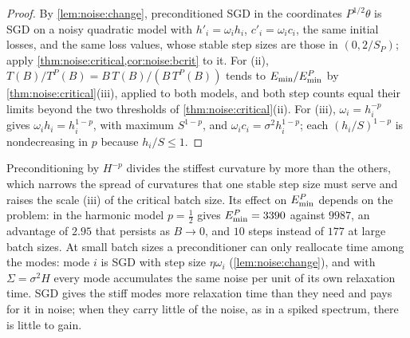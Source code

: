 \begin{refsection}
\begin{proof}
By \cref{lem:noise:change}, preconditioned SGD in the coordinates $P^{1/2}\theta$ is SGD on a noisy quadratic model with $h'_i=\omega_ih_i$, $c'_i=\omega_ic_i$, the same initial losses, and the same loss values, whose stable step sizes are those in $(0,2/S_P)$; apply \cref{thm:noise:critical,cor:noise:bcrit} to it. For (ii), $T(B)/T^P(B)=B\,T(B)/(B\,T^P(B))$ tends to $E_{\min}/E_{\min}^P$ by \cref{thm:noise:critical}(iii), applied to both models, and both step counts equal their limits beyond the two thresholds of \cref{thm:noise:critical}(ii). For (iii), $\omega_i=h_i^{-p}$ gives $\omega_ih_i=h_i^{1-p}$, with maximum $S^{1-p}$, and $\omega_ic_i=\sigma^2h_i^{1-p}$; each $(h_i/S)^{1-p}$ is nondecreasing in $p$ because $h_i/S\le1$.
\end{proof}

Preconditioning by $H^{-p}$ divides the stiffest curvature by more than the others, which narrows the spread of curvatures that one stable step size must serve and raises the scale (iii) of the critical batch size. Its effect on $E_{\min}^P$ depends on the problem: in the harmonic model $p=\frac12$ gives $E_{\min}^P=3390$ against $9987$, an advantage of $2.95$ that persists as $B\to0$, and $10$ steps instead of $177$ at large batch sizes. At small batch sizes a preconditioner can only reallocate time among the modes: mode $i$ is SGD with step size $\eta\omega_i$ (\cref{lem:noise:change}), and with $\Sigma=\sigma^2H$ every mode accumulates the same noise per unit of its own relaxation time. SGD gives the stiff modes more relaxation time than they need and pays for it in noise; when they carry little of the noise, as in a spiked spectrum, there is little to gain.


\end{refsection}
